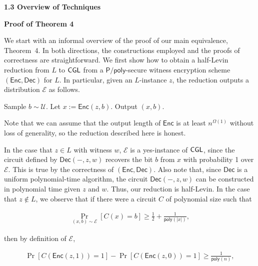 \documentclass[10pt,a4paper]{article}
\begin{document}
\par\medskip\noindent\textbf{
1.3 Overview of Techniques}\par




\par\medskip\noindent\textbf{Proof of Theorem 4
}\par




We start with an informal overview of the proof of our main equivalence, Theorem 4. In both directions, the constructions employed and the proofs of correctness are straightforward. We first show how to obtain a half-Levin reduction from $L$ to ${\sf CGL}$ from a ${\mathsf{P}}/{\mathsf{poly}}$-secure witness encryption scheme $({\mathsf{Enc}},{\mathsf{Dec}})$ for $L$. In particular, given an $L$-instance $z$, the reduction outputs a distribution $\mathcal{E}$ as follows.\par



Sample $b\sim\mathcal{U}$. Let $x:={\mathsf{Enc}}(z,b)$. Output $(x,b)$.\par



Note that we can assume that the output length of ${\mathsf{Enc}}$ is at least $n^{\Omega(1)}$ without loss of generality, so the reduction described here is honest.\par




In the case that $z\in L$ with witness $w$, $\mathcal{E}$ is a yes-instance of ${\sf CGL}$, since the circuit defined by ${\mathsf{Dec}}(-,z,w)$ recovers the bit $b$ from $x$ with probability 1 over $\mathcal{E}$. This is true by the correctness of $({\mathsf{Enc}},{\mathsf{Dec}})$. Also note that, since ${\mathsf{Dec}}$ is a uniform polynomial-time algorithm, the circuit ${\mathsf{Dec}}(-,z,w)$ can be constructed in polynomial time given $z$ and $w$. Thus, our reduction is half-Levin. In the case that $z\notin L$, we observe that if there were a circuit $C$ of polynomial size such that\par


\[\begin{gathered}
\Pr_{(x,b)\sim\mathcal{E}}[C(x)=b]\geq\frac{1}{2}+\frac{1}{{\mathsf{poly}}(|x|)},
\end{gathered}\]


then by definition of $\mathcal{E}$,\par


\[\begin{gathered}
\Pr[C({\mathsf{Enc}}(z,1))=1]-\Pr[C({\mathsf{Enc}}(z,0))=1]\geq\frac{1}{{\mathsf{poly}}(n)},
\end{gathered}\]
\end{document}
